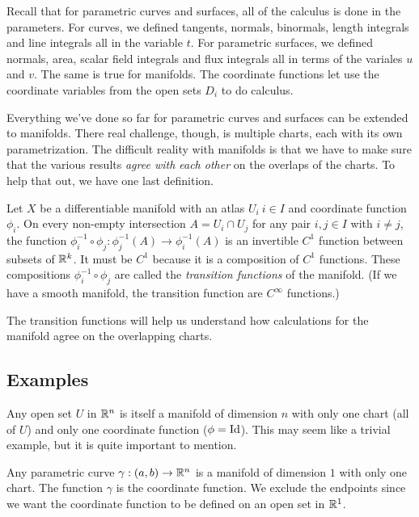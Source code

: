 \documentclass[fleqn,letterpaper]{report}
\begin{document}
Recall that for parametric curves and surfaces, all of the
calculus is done in the parameters. For curves, we defined
tangents, normals, binormals, length integrals and line
integrals all in the variable $t$. For parametric surfaces, we
defined normals, area, scalar field integrals and flux
integrals all in terms of the variales $u$ and $v$. The same
is true for manifolds. The coordinate functions let use 
the coordinate variables from the open sets $D_i$ to do 
calculus. 

Everything we've done so far for parametric curves and
surfaces can be extended to manifolds. There real challenge,
though, is multiple charts, each with its own
parametrization. The difficult reality with manifolds is that
we have to make sure that the various results \emph{agree with
each other} on the overlaps of the charts. To help that out,
we have one last definition.

\begin{defn}
Let $X$ be a differentiable manifold with an atlas $U_i \ i
\in I$ and coordinate function $\phi_i$.  On every non-empty
intersection $A = U_i \cap U_j$ for any pair $i,j \in I$ with
$i \neq j$, the function $\phi_i^{-1} \circ \phi_j:
\phi_j^{-1}(A) \rightarrow \phi_i^{-1}(A)$ is an invertible
$C^1$ function between subsets of $\mathbb{R}^k$. It must be $C^1$
because it is a composition of $C^1$ functions. These
compositions $\phi_i^{-1} \circ \phi_j$ are called the
\emph{transition functions} of the manifold. (If we have a
smooth manifold, the transition function are $C^{\infty}$
functions.) 
\end{defn}

The transition functions will help us understand how
calculations for the manifold agree on the overlapping charts. 

\subsection{Examples}
\label{manifold-examples}

\begin{example}
Any open set $U$ in $\mathbb{R}^n$ is itself a manifold of dimension
$n$ with only one chart (all of $U$) and only one coordinate
function ($\phi = \mathrm{Id}$). This may seem like a trivial example,
but it is quite important to mention.
\end{example}

\begin{example}
Any parametric curve $\gamma: (a,b) \rightarrow \mathbb{R}^n$ is 
a manifold of dimension $1$ with only one chart. The function
$\gamma$ is the coordinate function. We exclude the endpoints
since we want the coordinate function to be defined on an open
set in $\mathbb{R}^1$.
\end{example}
\end{document}
